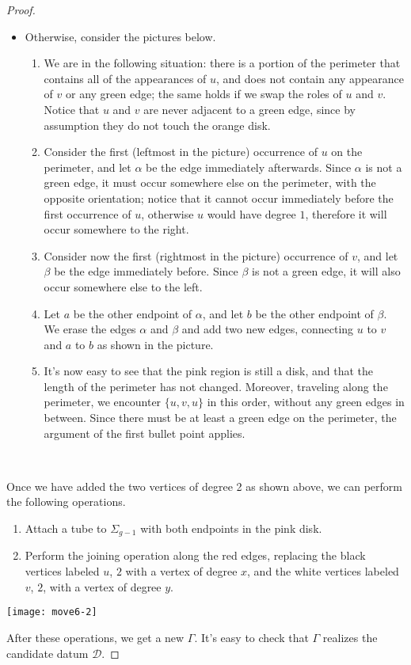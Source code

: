 \documentclass{article}
\begin{document}
\begin{proof}
\begin{itemize}
\item Otherwise, consider the pictures below.
\begin{enumerate}
\item We are in the following situation: there is a portion of the perimeter that contains all of the appearances of $u$, and does not contain any appearance of $v$ or any green edge; the same holds if we swap the roles of $u$ and $v$. Notice that $u$ and $v$ are never adjacent to a green edge, since by assumption they do not touch the orange disk.
\item Consider the first (leftmost in the picture) occurrence of $u$ on the perimeter, and let $\alpha$ be the edge immediately afterwards. Since $\alpha$ is not a green edge, it must occur somewhere else on the perimeter, with the opposite orientation; notice that it cannot occur immediately before the first occurrence of $u$, otherwise $u$ would have degree $1$, therefore it will occur somewhere to the right.
\item Consider now the first (rightmost in the picture) occurrence of $v$, and let $\beta$ be the edge immediately before. Since $\beta$ is not a green edge, it will also occur somewhere else to the left.
\item Let $a$ be the other endpoint of $\alpha$, and let $b$ be the other endpoint of $\beta$. We erase the edges $\alpha$ and $\beta$ and add two new edges, connecting $u$ to $v$ and $a$ to $b$ as shown in the picture.
\item It's now easy to see that the pink region is still a disk, and that the length of the perimeter has not changed. Moreover, traveling along the perimeter, we encounter $\{u,v,u\}$ in this order, without any green edges in between. Since there must be at least a green edge on the perimeter, the argument of the first bullet point applies.
\end{enumerate}
\begin{center}
\newcommand{\pic}[1]{\raisebox{-1.\height}{\texttt{[image: \#1]}}}
\pic{move6-2-2-1}\qquad\pic{move6-2-2-2}\qquad\pic{move6-2-2-3}\\
\bigskip
\pic{move6-2-2-4}\qquad\pic{move6-2-2-5}
\end{center}
\end{itemize}
Once we have added the two vertices of degree 2 as shown above, we can perform the following operations.
\begin{enumerate}
\item Attach a tube to $\Sigma_{g-1}$ with both endpoints in the pink disk.
\item Perform the joining operation along the red edges, replacing the black vertices labeled $u$, $2$ with a vertex of degree $x$, and the white vertices labeled $v$, $2$, with a vertex of degree $y$.
\end{enumerate}
\begin{center}
\texttt{[image: move6-2]}
\end{center}
After these operations, we get a new \dessin{} $\Gamma$. It's easy to check that $\Gamma$ realizes the candidate datum $\mathcal{D}$.
\end{proof}
\end{document}
